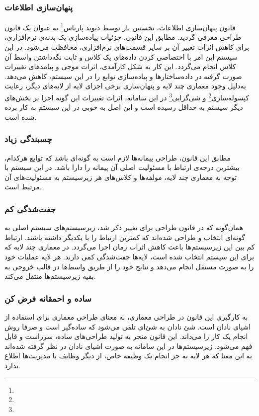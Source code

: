 \documentclass[12pt]{article}
\begin{document}
	\subsubsection{پنهان‌سازی اطلاعات}
	قانون پنهان‌سازی اطلاعات، نخستین بار توسط دیوید پارناس\footnote{} به عنوان یک قانون طراحی معرفی گردید. مطابق این قانون، جزئیات پیاده‌سازی یک بدنه‌ی نرم‌افزاری، برای کاهش اثرات تغییر آن بر سایر قسمت‌های نرم‌افزاری، محافظت می‌شود. در این سیستم این امر با اختصاصی کردن داده‌های یک کلاس و ثابت نگه‌داشتن واسط آن کلاس انجام می‌‌گردد. این کار به شکل کارآمدی، اثرات موجی و پیامدهای تغییرات صورت گرفته در داده‌ساختارها و پیاده‌سازی توابع را در این سیستم، کاهش می‌دهد. به‌دلیل وجود معماری چند لایه و پنهان‌سازی برخی اجزای لایه از لایه‌های دیگر، رعایت کپسوله‌سازی\footnote{} و شی‌گرایی\footnote{} در این سامانه، اثرات تغییرات این گونه اجزا بر بخش‌های دیگر سیستم به حداقل رسیده است و این اصل به خوبی در این سیستم به کار برده شده است.
	\subsubsection{چسبندگی زیاد}
	مطابق این قانون، طراحی پیمانه‌ها لازم است به گونه‌ای باشد که توابع هر‌کدام، بیشترین درجه‌ی ارتباط با مسئولیت اصلی آن پیمانه را دارا باشد. در این سیستم با توجه به معماری چند لایه، مولفه‌ها و کلاس‌های هر زیرسیستم به مسئولیت‌های آن مرتبط است.

	\subsubsection{جفت‌شدگی کم}
	همان‌گونه که در قانون طراحی برای تغییر ذکر شد، زیرسیستم‌های سیستم اصلی به گونه‌ای انتخاب و طراحی شده‌اند که کمترین ارتباط را با یکدیگر داشته باشند. ارتباط کم بین این زیرسیستم‌ها باعث کاهش اثرات زمان اجرا می‌گردد.
	در معماری چند لایه که برای این سیستم انتخاب شده است، لایه‌ها جفت‌شدگی کمی دارند. هر لایه عملیات خود را به صورت مستقل انجام می‌دهد و نتایج خود را از طریق واسط‌ها در قالب خروجی به بقیه زیرسیستم‌ها منتقل می‌کند.

	\subsubsection{ساده و احمقانه فرض کن}
	به کارگیری این قانون در طراحی معماری، به معنای طراحی معماری برای استفاده از اشیای نادان است. شئ نادان به شئ‌ای تلقی می‌شود که ساده‌گیر است و صرفا روش انجام یک کار را می‌داند. این قانون منجر به تولید طراحی‌های ساده، سرراست و قابل فهم می‌شود. زیرسیستم‌ها در این سامانه به صورت اشیای نادان در نظر گرفته شده‌اند به این معنا که هر لایه به جز انجام یک وظیفه خاص، از دیگر وظایف یا مدیریت‌ها اطلاع ندارد.
\end{document}
